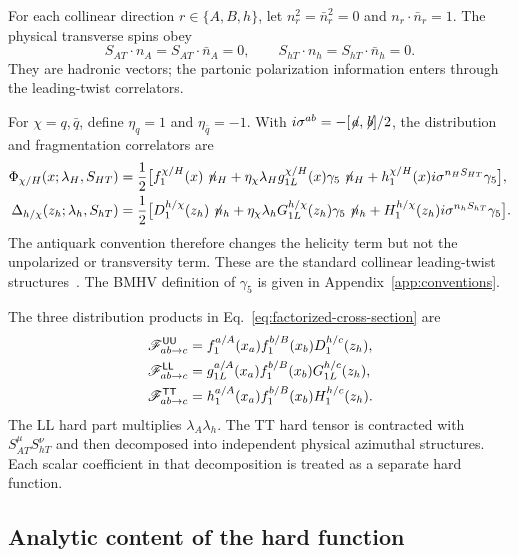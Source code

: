For each collinear direction $r\in\{A,B,h\}$, let
$n_r^2=\bar n_r^2=0$ and $n_r\cdot\bar n_r=1$.  The physical transverse
spins obey
\begin{equation}
 S_{AT}\cdot n_A=S_{AT}\cdot\bar n_A=0,
 \qquad
 S_{hT}\cdot n_h=S_{hT}\cdot\bar n_h=0.
 \label{eq:transverse-spin-conditions}
\end{equation}
They are hadronic vectors; the partonic polarization information enters
through the leading-twist correlators.

For $\chi=q,\bar q$, define $\eta_q=1$ and
$\eta_{\bar q}=-1$.  With
$i\sigma^{ab}=-[\not\!a,\not\!b]/2$, the distribution and fragmentation
correlators are
\begin{align}
 \Phi_{\chi/H}(x;\lambda_H,S_{HT})
 =\frac12\bigl[&f_1^{\chi/H}(x)\not\!n_H
 +\eta_\chi\lambda_Hg_{1L}^{\chi/H}(x)
   \gamma_5\not\!n_H
 +h_1^{\chi/H}(x)i\sigma^{n_HS_{HT}}\gamma_5\bigr],
 \label{eq:pdf-correlator}\\
 \Delta_{h/\chi}(z_h;\lambda_h,S_{hT})
 =\frac12\bigl[&D_1^{h/\chi}(z_h)\not\!n_h
 +\eta_\chi\lambda_hG_{1L}^{h/\chi}(z_h)
   \gamma_5\not\!n_h
 +H_1^{h/\chi}(z_h)i\sigma^{n_hS_{hT}}\gamma_5\bigr].
 \label{eq:ff-correlator}
\end{align}
The antiquark convention therefore changes the helicity term but not the
unpolarized or transversity term.  These are the standard collinear
leading-twist structures~\cite{Bacchetta:2006tn}.  The BMHV definition of
$\gamma_5$ is given in Appendix~\ref{app:conventions}.

The three distribution products in Eq.~\eqref{eq:factorized-cross-section}
are
\begin{align}
 \mathscr F^{\mathsf{UU}}_{ab\to c}
 &=f_1^{a/A}(x_a)f_1^{b/B}(x_b)D_1^{h/c}(z_h),
 \notag\\
 \mathscr F^{\mathsf{LL}}_{ab\to c}
 &=g_{1L}^{a/A}(x_a)f_1^{b/B}(x_b)G_{1L}^{h/c}(z_h),
 \notag\\
 \mathscr F^{\mathsf{TT}}_{ab\to c}
 &=h_1^{a/A}(x_a)f_1^{b/B}(x_b)H_1^{h/c}(z_h).
 \label{eq:polarized-distribution-products}
\end{align}
The LL hard part multiplies $\lambda_A\lambda_h$.  The TT hard tensor is
contracted with $S_{AT}^\mu S_{hT}^\nu$ and then decomposed into independent
physical azimuthal structures.  Each scalar coefficient in that decomposition
is treated as a separate hard function.

\subsection{Analytic content of the hard function}


